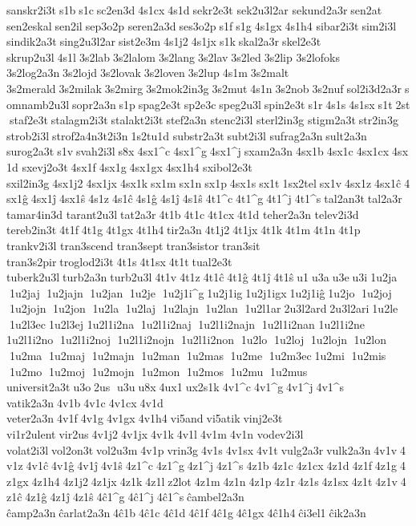 sanskr2i3t s1b s1c sc2en3d 4s1cx 4s1d sekr2e3t 
sek2u3l2ar 
sekund2a3r sen2at 	sen2eskal sen2il sep3o2p 	seren2a3d ses3o2p s1f s1g 4s1gx 4s1h4 	sibar2i3t sim2i3l 
sindik2a3t sing2u3l2ar sist2e3m 4s1j2 4s1jx s1k skal2a3r skel2e3t 	skrup2u3l 4s1l 3s2lab 3s2lalom 3s2lang 3s2lav 3s2led 3s2lip 	3s2lofoks 
3s2log2a3n 3s2lojd 3s2lovak 3s2loven 3s2lup 4s1m 3s2malt 	3s2merald 3s2milak 3s2mirg 3s2mok2in3g 3s2mut 4s1n 3s2nob 3s2nuf sol2i3d2a3r somnamb2u3l sopr2a3n s1p spag2e3t sp2e3c speg2u3l spin2e3t s1r 4s1s 4s1sx s1t 2st  staf2e3t stalagm2i3t stalakt2i3t stef2a3n 	stenc2i3l 
sterl2in3g 	stigm2a3t str2in3g 	strob2i3l strof2a4n3t2i3n 1s2tu1d 
substr2a3t subt2i3l 
sufrag2a3n sult2a3n 	surog2a3t s1v svah2i3l s8x 4sx1^c 4sx1^g 4sx1^j sxam2a3n 4sx1b 4sx1c 4sx1cx 4sx1d 	sxevj2o3t 4sx1f 4sx1g 4sx1gx 4sx1h4 
sxibol2e3t 	sxil2in3g 4sx1j2 4sx1jx 4sx1k sx1m sx1n sx1p 4sx1s sx1t 1sx2tel sx1v 4sx1z 4sx1ĉ 4sx1ĝ 4sx1ĵ 4sx1ŝ 4s1z 4s1ĉ 4s1ĝ 4s1ĵ 4s1ŝ 4t1^c 4t1^g 4t1^j 4t1^s tal2an3t tal2a3r 
tamar4in3d 
tarant2u3l tat2a3r 4t1b 4t1c 4t1cx 4t1d 	teher2a3n 	telev2i3d 
tereb2in3t 4t1f 4t1g 4t1gx 4t1h4 tir2a3n 4t1j2 4t1jx 4t1k 4t1m 4t1n 4t1p 
trankv2i3l 
tran3scend 	tran3sept tran3sistor tran3sit 
tran3s2pir troglod2i3t 4t1s 4t1sx 4t1t tual2e3t 
tuberk2u3l turb2a3n turb2u3l 4t1v 4t1z 4t1ĉ 4t1ĝ 4t1ĵ 4t1ŝ u1 u3a u3e u3i 1u2ja  1u2jaj  1u2jajn  1u2jan  1u2je  1u2j1i^g 1u2j1ig 1u2j1igx 1u2j1iĝ 1u2jo  1u2joj  1u2jojn  1u2jon  1u2la  1u2laj  1u2lajn  1u2lan  1u2l1ar 2u3l2ard 2u3l2ari 1u2le  1u2l3ec 1u2l3ej 
1u2l1i2na  1u2l1i2naj  1u2l1i2najn  1u2l1i2nan  
1u2l1i2ne  
1u2l1i2no  1u2l1i2noj  1u2l1i2nojn  1u2l1i2non  1u2lo  1u2loj  1u2lojn  1u2lon  1u2ma  1u2maj  1u2majn  1u2man  1u2mas  1u2me  1u2m3ec 1u2mi  1u2mis  1u2mo  1u2moj  1u2mojn  1u2mon  1u2mos  1u2mu  1u2mus  
universit2a3t u3o 2us  u3u u8x 4ux1 ux2s1k 4v1^c 4v1^g 4v1^j 4v1^s 	vatik2a3n 4v1b 4v1c 4v1cx 4v1d 	veter2a3n 4v1f 4v1g 4v1gx 4v1h4 vi5and vi5atik vinj2e3t 
vi1r2ulent vir2us 4v1j2 4v1jx 4v1k 4v1l 4v1m 4v1n 	vodev2i3l 	volat2i3l vol2on3t vol2u3m 4v1p vrin3g 4v1s 4v1sx 4v1t vulg2a3r vulk2a3n 4v1v 4v1z 4v1ĉ 4v1ĝ 4v1ĵ 4v1ŝ 4z1^c 4z1^g 4z1^j 4z1^s 4z1b 4z1c 4z1cx 4z1d 4z1f 4z1g 4z1gx 4z1h4 4z1j2 4z1jx 4z1k 4z1l z2lot 4z1m 4z1n 4z1p 4z1r 4z1s 4z1sx 4z1t 4z1v 4z1ĉ 4z1ĝ 4z1ĵ 4z1ŝ 4ĉ1^g 4ĉ1^j 4ĉ1^s ĉambel2a3n 	ĉamp2a3n ĉarlat2a3n 4ĉ1b 4ĉ1c 4ĉ1d 4ĉ1f 4ĉ1g 4ĉ1gx 4ĉ1h4 ĉi3el1 ĉik2a3n 
